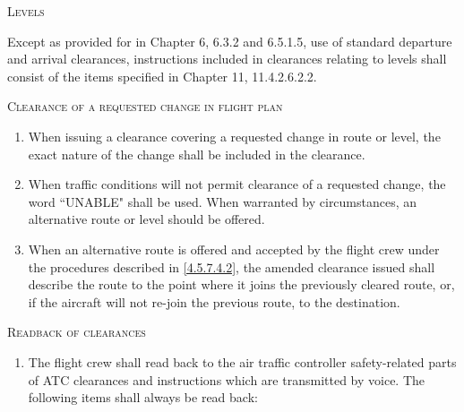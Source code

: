 \documentclass[../vATM.tex]{subfiles}
\begin{document}
\begin{enumeratesc}
        \item \textsc{Levels}
        \begin{enumempty}
            \item Except as provided for in Chapter 6, 6.3.2 and 6.5.1.5, use of standard departure and arrival clearances, instructions included in clearances relating to levels shall consist of the items specified in Chapter 11, 11.4.2.6.2.2.
        \end{enumempty}

        \item \textsc{Clearance of a requested change in flight plan}
        \begin{enumerate}
            \item When issuing a clearance covering a requested change in route or level, the exact nature of the change shall be included in the clearance.
            \item \label{4.5.7.4.2} When traffic conditions will not permit clearance of a requested change, the word ``UNABLE" shall be used. When warranted by circumstances, an alternative route or level should be offered.
            \item When an alternative route is offered and accepted by the flight crew under the procedures described in \ref{4.5.7.4.2}, the amended clearance issued shall describe the route to the point where it joins the previously cleared route, or, if the aircraft will not re-join the previous route, to the destination.
        \end{enumerate}

        \item \textsc{Readback of clearances}
        \begin{enumerate}
            \item The flight crew shall read back to the air traffic controller safety-related parts of ATC clearances and instructions which are transmitted by voice. The following items shall always be read back:


\end{enumerate}
\end{enumeratesc}
\end{document}
